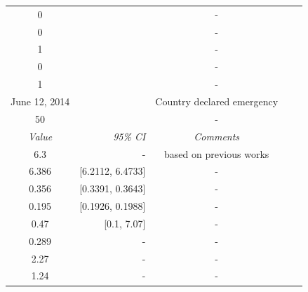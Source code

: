 \documentclass[10pt, journal,onecolumn]{IEEEtran}
\begin{document}
\begin{appendix}
\begin{table}[h]
{\begin{tabular}{@{}crccc@{}}
0& & -\\
0& & -\\
1& & -\\
0& & -\\
1& &-\\
June 12, 2014 &  & Country declared emergency\\
50 & & -\\
\cmidrule{1-3}
\textit{Value} & \textit{95\% CI} & \textit{Comments} \\
\midrule
6.3 & - & based on previous works\\
6.386 & [6.2112, 6.4733] & -\\
0.356 & [0.3391, 0.3643] & -\\
0.195 & [0.1926, 0.1988] & -\\
0.47 & [0.1, 7.07] & -\\
0.289 & - & -\\
2.27 & - &-\\
1.24 & - &-\\
\end{tabular}
}
\label{Table:parameter}
\end{table}



\end{appendix}
\end{document}
